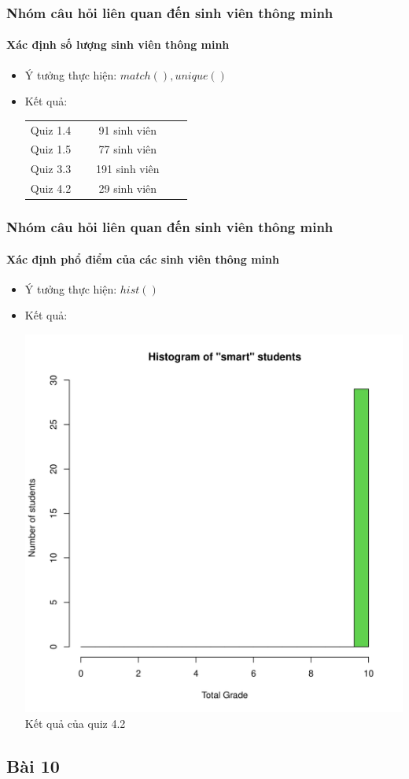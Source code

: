 \documentclass[english,10pt,table]{beamer}
\begin{document}
\frame
{
\frametitle{Nhóm câu hỏi liên quan đến sinh viên thông minh}
\framesubtitle{Xác định số lượng sinh viên thông minh}
\begin{itemize}
    \item Ý tưởng thực hiện: $match(), unique()$
    \item Kết quả:\\
    \begin{center}
        \begin{tabular}{l l c c c} 
             Quiz 1.4 & $\;$ & 91 sinh viên\\
             Quiz 1.5 & $\;$ & 77 sinh viên\\
             Quiz 3.3 & $\;$ & 191 sinh viên\\
             Quiz 4.2 & $\;$ & 29 sinh viên
        \end{tabular}
    \end{center}
\end{itemize}
}

\frame
{
\frametitle{Nhóm câu hỏi liên quan đến sinh viên thông minh}
\framesubtitle{Xác định phổ điểm của các sinh viên thông minh}
\begin{itemize}
    \item Ý tưởng thực hiện: $hist()$
    \item Kết quả:\\
    \begin{center}
        \includegraphics[width = 6 cm]{Images/img9-1-4.png}\\
        Kết quả của quiz 4.2
    \end{center}
\end{itemize}
}

\subsection{Bài 10}
\end{document}
